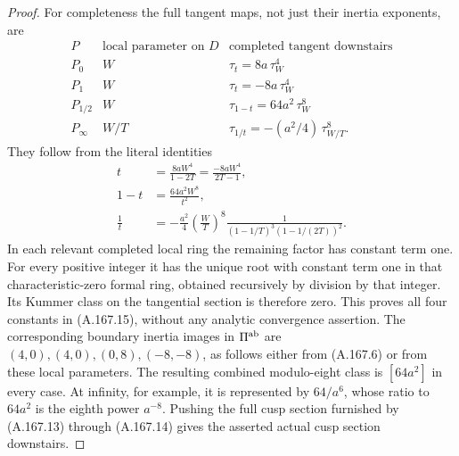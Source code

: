 \begin{proof}
For completeness the full tangent maps, not just their inertia
exponents, are
\[
 \begin{array}{c|c|c}
 P&\text{local parameter on }D&\text{completed tangent downstairs}\\\hline
 P_0&W&\tau_t=8a\,\tau_W^4\\
 P_1&W&\tau_t=-8a\,\tau_W^4\\
 P_{1/2}&W&\tau_{1-t}=64a^2\,\tau_W^8\\
 P_\infty&W/T&\tau_{1/t}=-(a^2/4)\,\tau_{W/T}^8.
 \end{array}
\tag{A.167.15}
\]
They follow from the literal identities
\[
 \begin{aligned}
 t&=\frac{8aW^4}{1-2T}
       =\frac{-8aW^4}{2T-1},\\
 1-t&=\frac{64a^2W^8}{t^2},\\
 \frac1t&=-\frac{a^2}{4}\left(\frac WT\right)^8
       \frac1{(1-1/T)^3(1-1/(2T))^2}.
 \end{aligned}
\tag{A.167.16}
\]
In each relevant completed local ring the remaining factor has
constant term one.  For every positive integer it has the unique
root with constant term one in that characteristic-zero formal ring,
obtained recursively by division by that integer.  Its Kummer class
on the tangential section is therefore zero.  This proves all four
constants in (A.167.15), without any analytic convergence assertion.
The corresponding boundary inertia images in \(\Pi^{\rm ab}\)
are \((4,0),(4,0),(0,8),(-8,-8)\), as follows either from
(A.167.6) or from these local parameters.  The resulting combined
modulo-eight class is \([64a^2]\) in every case.  At infinity, for
example, it is represented by \(64/a^6\), whose ratio to
\(64a^2\) is the eighth power \(a^{-8}\).
Pushing the full cusp section furnished by (A.167.13) through
(A.167.14) gives the asserted actual cusp section downstairs.


\end{proof}
